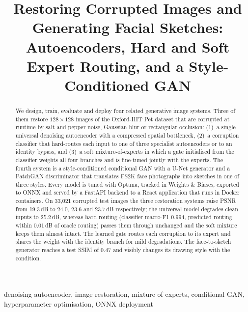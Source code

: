 \documentclass[conference]{IEEEtran}
\begin{document}
\title{Restoring Corrupted Images and Generating Facial Sketches:\\
Autoencoders, Hard and Soft Expert Routing, and a Style-Conditioned GAN}

\author{
}

\maketitle

\begin{abstract}
We design, train, evaluate and deploy four related generative image
systems. Three of them restore $128\times128$ images of the Oxford-IIIT
Pet dataset that are corrupted at runtime by salt-and-pepper noise,
Gaussian blur or rectangular occlusion: (1)~a single universal denoising
autoencoder with a compressed spatial bottleneck, (2)~a corruption
classifier that hard-routes each input to one of three specialist
autoencoders or to an identity bypass, and (3)~a soft mixture-of-experts
in which a gate initialised from the classifier weights all four branches
and is fine-tuned jointly with the experts. The fourth system is a
style-conditioned conditional GAN with a U-Net generator and a PatchGAN
discriminator that translates FS2K face photographs into sketches in one of
three styles. Every model is tuned with Optuna, tracked in Weights \&
Biases, exported to ONNX and served by a FastAPI backend to a React
application that runs in Docker containers.
On 33,021 corrupted test images the three restoration systems raise PSNR
from 19.3\,dB to 24.0, 23.6 and 23.7\,dB respectively; the universal model
degrades clean inputs to 25.2\,dB, whereas hard routing (classifier
macro-F1 0.994, predicted routing within 0.01\,dB of oracle routing) passes
them through unchanged and the soft mixture keeps them almost intact. The
learned gate routes each corruption to its expert and shares the weight with
the identity branch for mild degradations. The face-to-sketch generator
reaches a test SSIM of 0.47 and visibly changes its drawing style with the
condition.
\end{abstract}

\begin{IEEEkeywords}
denoising autoencoder, image restoration, mixture of experts,
conditional GAN, hyperparameter optimisation, ONNX deployment
\end{IEEEkeywords}
\end{document}
